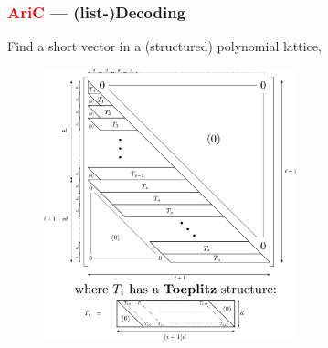 \documentclass[c]{beamer}
\begin{document}
\begin{frame}
	\frametitle{\textcolor{red}{AriC} --- (list-)Decoding}

	Find a \alert{short vector} in a (structured) \alert{polynomial lattice},
	\begin{figure}
		\centering
		\includegraphics[width=0.65\textwidth]{JDD2014/figures/structured_lattice_matrix.pdf}
	\end{figure}
\end{frame}
%
%
\end{document}
